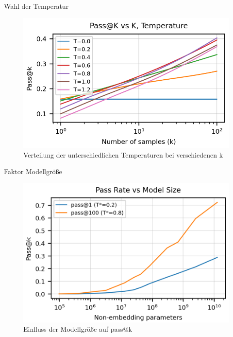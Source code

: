 \documentclass{beamer}              %
\begin{document}
\begin{frame}{Wahl der Temperatur}
    \begin{figure}
        \centering
        \includegraphics[width=0.7\paperwidth]{images/passkvstemp.png}
        \caption{Verteilung der unterschiedlichen Temperaturen bei verschiedenen k\cite{chen2021evaluating}}
    \end{figure}
\end{frame}

\begin{frame}{Faktor Modellgröße}
    \begin{figure}
        \centering
        \includegraphics[width=0.7\paperwidth]{images/passkvssize.png}
        \caption{Einfluss der Modellgröße auf pass@k\cite{chen2021evaluating}}
    \end{figure}
\end{frame}
\end{document}
